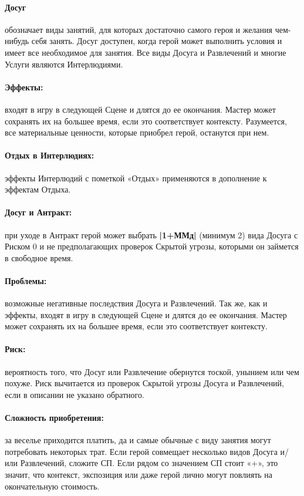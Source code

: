 \paragraph{Досуг} обозначает виды занятий, для которых достаточно самого героя и желания чем-нибудь себя занять. Досуг доступен, когда герой может выполнить условия и имеет все необходимое для занятия.
\newline Все виды Досуга и Развлечений и многие Услуги являются Интерлюдиями.

\paragraph{Эффекты:} входят в игру в следующей Сцене и длятся до ее окончания. Мастер может сохранять их на большее время, если это соответствует контексту. Разумеется, все материальные ценности, которые приобрел герой, останутся при нем.
\paragraph{Отдых в Интерлюдиях:} эффекты Интерлюдий с пометкой «Отдых» применяются в дополнение к эффектам Отдыха.
\paragraph{Досуг и Антракт:} при уходе в Антракт герой может выбрать \textbf{|1+ММд|} (минимум 2) вида Досуга с Риском 0 и не предполагающих проверок Скрытой угрозы, которыми он займется в свободное время.
\paragraph{Проблемы:} возможные негативные последствия Досуга и Развлечений. Так же, как и эффекты, входят в игру в следующей Сцене и длятся до ее окончания. Мастер может сохранять их на большее время, если это соответствует контексту.
\paragraph{Риск:} вероятность того, что Досуг или Развлечение обернутся тоской, унынием или чем похуже. Риск вычитается из проверок Скрытой угрозы Досуга и Развлечений, если в описании не указано обратного.
\paragraph{Сложность приобретения:} за веселье приходится платить, да и самые обычные с виду занятия могут потребовать некоторых трат. Если герой совмещает несколько видов Досуга и/ или Развлечений, сложите СП. 
\newline Если рядом со значением СП стоит «+», это значит, что контекст, экспозиция или даже герой лично могут повлиять на окончательную стоимость.
